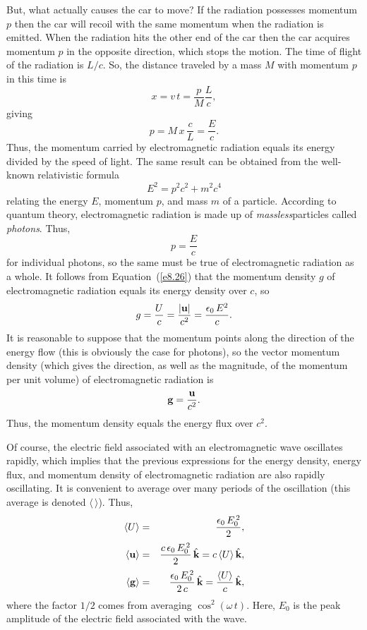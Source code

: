 But, what actually causes the car to move? If the radiation possesses momentum
$p$ then the car will recoil with the same momentum when the radiation is emitted.
When the radiation hits the other end of the car then the car acquires momentum
$p$ in the opposite direction, which stops the motion. The time of flight of
the radiation is $L/c$. So, the distance traveled by a mass $M$ with momentum
$p$ in this time is
\begin{equation}
x = v \,t = \frac{p}{M} \frac{L}{c},
\end{equation}
giving
\begin{equation}\label{e8.26}
p = M\,x\, \frac{c}{L} = \frac{E}{c}.
\end{equation}
Thus, the momentum carried by electromagnetic radiation equals its energy divided by
the speed of light. The same result can be obtained from the well-known
relativistic formula
\begin{equation}
E^2 = p^2 c^2 + m^2 c^4
\end{equation}
relating the energy $E$, momentum $p$, and mass $m$ of a particle. According to
quantum theory, electromagnetic radiation is made up of {\em massless}\/particles
called {\em photons}. Thus,
\begin{equation}
	p = \frac{E}{c}
\end{equation}
for individual photons, so the same must be true of electromagnetic radiation
as a whole. It follows from Equation~(\ref{e8.26})
 that the momentum density $g$ of electromagnetic
radiation equals its energy density over $c$, so
\begin{equation}
g = \frac{U}{c}= \frac{|{\bf u}|}{c^2} = \frac{\epsilon_0 \,E^2}{c}.
\end{equation}
It is reasonable to suppose that the momentum points along the direction
of the energy flow (this is obviously the case for photons),
 so the vector momentum density (which gives the direction,
as well as the magnitude, of the momentum per unit volume) of electromagnetic
radiation is
\begin{equation}\label{e8.30}
{\bf g} = \frac{{\bf u}}{c^2}.
\end{equation}
Thus, the momentum density equals the energy flux over $c^2$. 

Of course, the electric field associated with an electromagnetic wave oscillates
rapidly, which implies  that the previous expressions  for the energy density,
energy flux, and momentum density of electromagnetic radiation are also
rapidly oscillating. It is convenient to average over many periods of
the oscillation (this average is denoted $\langle \,\rangle$). Thus,
\begin{eqnarray}
\langle U\rangle &=& \frac{\epsilon_0\, E_0^{\,2}}{2},\\[0.5ex]
\langle {\bf u}\rangle&=& \frac{c\,\epsilon_0 \,E_0^{\,2}}{2} \,\hat{\bf k}= c \,\langle U\rangle\, \hat{\bf k}, \label{e8.35} \\[0.5ex]
\langle {\bf g} \rangle &=& \frac{\epsilon_0 \,E_0^{\,2}}{2\,c}\,\hat{\bf k} = \frac{\langle U\rangle}{c}
\,\hat{\bf k},
\end{eqnarray}
where the factor $1/2$ comes from averaging $\cos^2 (\omega\, t)$. Here,
$E_0$ is the peak amplitude of the electric field associated with the wave. 

